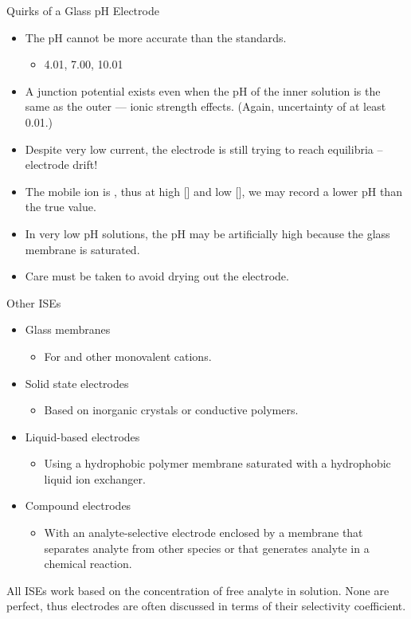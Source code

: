 \documentclass[notes=show]{beamer}
\begin{document}
\begin{frame}{Quirks of a Glass pH Electrode}
	\begin{itemize}
		\item The pH cannot be more accurate than the standards.
			\begin{itemize}
				\item 4.01, 7.00, 10.01
			\end{itemize}
		\item A junction potential exists even when the pH of the inner
			solution is the same as the outer --- ionic strength
			effects. (Again, uncertainty of at least \num{0.01}.)
		\item Despite very low current, the electrode is still trying to
			reach equilibria -- electrode drift!
		\item The mobile ion is , thus at high [] and
			low [], we may record a lower pH than the true
			value.
		\item In very low pH solutions, the pH may be artificially high
			because the glass membrane is \alert{saturated}.
		\item Care must be taken to avoid drying out the electrode.
	\end{itemize}
\end{frame}

\begin{frame}{Other ISEs}
	\begin{itemize}
		\item Glass membranes
			\begin{itemize}
				\item For  and other monovalent cations.
			\end{itemize}
		\item Solid state electrodes
			\begin{itemize}
				\item Based on inorganic crystals or conductive
					polymers.
			\end{itemize}
		\item Liquid-based electrodes
			\begin{itemize}
				\item Using a hydrophobic polymer membrane
					saturated with a hydrophobic liquid ion
					exchanger.
			\end{itemize}
		\item Compound electrodes
			\begin{itemize}
				\item With an analyte-selective electrode
					enclosed by a membrane that separates
					analyte from other species or that
					generates analyte in a chemical
					reaction.
			\end{itemize}
	\end{itemize}

	All ISEs work based on the concentration of \alert{free} analyte in
	solution. None are perfect, thus electrodes are often discussed in terms
	of their \alert{selectivity coefficient}.

	\end{frame}
\end{document}

